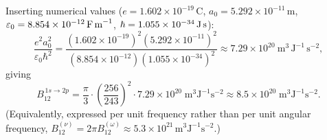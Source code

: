 \documentclass[11pt]{article}
\begin{document}
Inserting numerical values
($e=1.602\times10^{-19}\,\text{C}$, $a_0=5.292\times10^{-11}\,\text{m}$, $\varepsilon_0=8.854\times10^{-12}\,\text{F\,m}^{-1}$, $\hbar=1.055\times10^{-34}\,\text{J\,s}$):
\begin{equation*}
    \frac{e^2 a_0^2}{\varepsilon_0\hbar^2} = \frac{(1.602\times10^{-19})^2(5.292\times10^{-11})^2}{(8.854\times10^{-12})(1.055\times10^{-34})^2}
    \approx 7.29\times10^{20}\ \text{m}^3\,\text{J}^{-1}\,\text{s}^{-2},
\end{equation*}
giving
\begin{equation*}
    \boxed{\;B_{12}^{\,1s\to 2p}=\frac{\pi}{3}\cdot\left(\frac{256}{243}\right)^2\cdot 7.29\times10^{20}\;\text{m}^3\text{J}^{-1}\text{s}^{-2}\approx 8.5\times 10^{20}\;\text{m}^3\text{J}^{-1}\text{s}^{-2}.\;}
\end{equation*}
(Equivalently, expressed per unit frequency rather than per unit angular frequency, $B_{12}^{(\nu)}=2\pi B_{12}^{(\omega)}\approx 5.3\times 10^{21}\,\text{m}^3\text{J}^{-1}\text{s}^{-2}$.)
\end{document}
